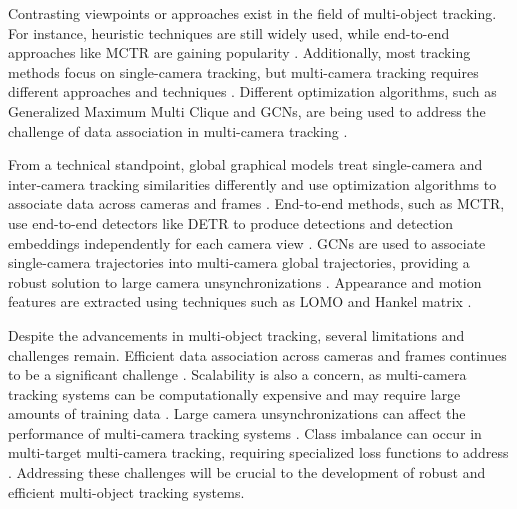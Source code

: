 \documentclass[conference]{IEEEtran}
\begin{document}
Contrasting viewpoints or approaches exist in the field of multi-object tracking. For instance, heuristic techniques are still widely used, while end-to-end approaches like MCTR are gaining popularity \cite{MCTR: Multi Camera Tracking Transformer}. Additionally, most tracking methods focus on single-camera tracking, but multi-camera tracking requires different approaches and techniques \cite{Challenge of Multi-Camera Tracking, An equalised global graphical model-based approach for multi-camera object tracking}. Different optimization algorithms, such as Generalized Maximum Multi Clique and GCNs, are being used to address the challenge of data association in multi-camera tracking \cite{Multi-camera Multi-Object Tracking, Graph Convolutional Network for Multi-Target Multi-Camera Vehicle Tracking}.

From a technical standpoint, global graphical models treat single-camera and inter-camera tracking similarities differently and use optimization algorithms to associate data across cameras and frames \cite{An equalised global graphical model-based approach for multi-camera object tracking, Multi-camera Multi-Object Tracking}. End-to-end methods, such as MCTR, use end-to-end detectors like DETR to produce detections and detection embeddings independently for each camera view \cite{MCTR: Multi Camera Tracking Transformer}. GCNs are used to associate single-camera trajectories into multi-camera global trajectories, providing a robust solution to large camera unsynchronizations \cite{Graph Convolutional Network for Multi-Target Multi-Camera Vehicle Tracking}. Appearance and motion features are extracted using techniques such as LOMO and Hankel matrix \cite{Multi-camera Multi-Object Tracking}.

Despite the advancements in multi-object tracking, several limitations and challenges remain. Efficient data association across cameras and frames continues to be a significant challenge \cite{Challenge of Multi-Camera Tracking, Multi-camera Multi-Object Tracking}. Scalability is also a concern, as multi-camera tracking systems can be computationally expensive and may require large amounts of training data \cite{MCTR: Multi Camera Tracking Transformer}. Large camera unsynchronizations can affect the performance of multi-camera tracking systems \cite{Graph Convolutional Network for Multi-Target Multi-Camera Vehicle Tracking}. Class imbalance can occur in multi-target multi-camera tracking, requiring specialized loss functions to address \cite{Graph Convolutional Network for Multi-Target Multi-Camera Vehicle Tracking}. Addressing these challenges will be crucial to the development of robust and efficient multi-object tracking systems.
\end{document}
